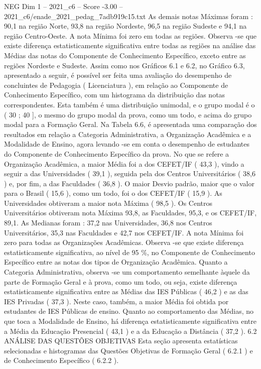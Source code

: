 \begin{textsample}{NEG Dim 1 – 2021\_c6 – Score -3.00 – 2021\_c6/enade\_2021\_pedag\_7adb919c15.txt}
As demais notas Máximas foram : 90,1 na região Norte, 93,8 na região Nordeste, 96,5 na região Sudeste e 94,1 na região Centro-Oeste.
A nota Mínima foi zero em todas as regiões.
Observa -se que existe diferença estatisticamente significativa entre todas as regiões na análise das Médias das notas do Componente de Conhecimento Específico, exceto entre as regiões Nordeste e Sudeste.
Assim como nos Gráficos 6.1 e 6.2, no Gráfico 6.3, apresentado a seguir, é possível ser feita uma avaliação do desempenho de concluintes de Pedagogia ( Licenciatura ), em relação ao Componente de Conhecimento Específico, com um histograma da distribuição das notas correspondentes.
Esta também é uma distribuição unimodal, e o grupo modal é o ( 30 ; 40 ], o mesmo do grupo modal da prova, como um todo, e acima do grupo modal para a Formação Geral.
Na Tabela 6.6, é apresentada uma comparação dos resultados em relação a Categoria Administrativa, a Organização Acadêmica e a Modalidade de Ensino, agora levando -se em conta o desempenho de estudantes do Componente de Conhecimento Específico da prova.
No que se refere a Organização Acadêmica, a maior Média foi a dos CEFET/IF ( 43,3 ), vindo a seguir a das Universidades ( 39,1 ), seguida pela dos Centros Universitários ( 38,6 ) e, por fim, a das Faculdades ( 36,8 ).
O maior Desvio padrão, maior que o valor para o Brasil ( 15,6 ), como um todo, foi o dos CEFET/IF ( 15,9 ).
As Universidades obtiveram a maior nota Máxima ( 98,5 ).
Os Centros Universitários obtiveram nota Máxima 93,8, as Faculdades, 95,3, e os CEFET/IF, 89,1.
As Medianas foram : 37,2 nas Universidades, 36,8 nos Centros Universitários, 35,3 nas Faculdades e 42,7 nos CEFET/IF.
A nota Mínima foi zero para todas as Organizações Acadêmicas.
Observa -se que existe diferença estatisticamente significativa, ao nível de 95 \%, no Componente de Conhecimento Específico entre as notas dos tipos de Organização Acadêmica.
Quanto a Categoria Administrativa, observa -se um comportamento semelhante àquele da parte de Formação Geral e à prova, como um todo, ou seja, existe diferença estatisticamente significativa entre as Médias das IES Públicas ( 46,2 ) e as das IES Privadas ( 37,3 ).
Neste caso, também, a maior Média foi obtida por estudantes de IES Públicas de ensino.
Quanto ao comportamento das Médias, no que toca a Modalidade de Ensino, há diferença estatisticamente significativa entre a Média da Educação Presencial ( 43,1 ) e a da Educação a Distância ( 37,2 ). 6.2 ANÁLISE DAS QUESTÕES OBJETIVAS Esta seção apresenta estatísticas selecionadas e histogramas das Questões Objetivas de Formação Geral ( 6.2.1 ) e de Conhecimento Específico ( 6.2.2 ).

\end{textsample}
